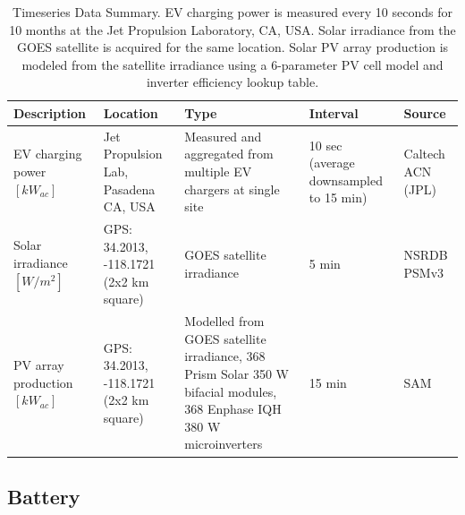 \documentclass[journal,article,submit,pdftex,moreauthors]{Definitions/mdpi}
\begin{document}
\begin{table}[!h]
  \centering
  \caption{Timeseries Data Summary. EV charging power is measured every 10 seconds for 10 months at the Jet Propulsion Laboratory, CA, USA. Solar irradiance from the GOES satellite is acquired for the same location. Solar PV array production is modeled from the satellite irradiance using a 6-parameter PV cell model and inverter efficiency lookup table.\label{tab:loadsectors}}
  \label{tab:data-summary}
  \begin{tabularx}{\linewidth}{XXXXX}
    \toprule
    Description                     & Location                                & Type                                                                                                             & Interval                               & Source            \\
    \midrule
    EV charging power $[kW_{ac}]$    & Jet Propulsion Lab, Pasadena CA, USA    & Measured and aggregated from multiple  EV chargers at single site                                                & 10 sec (average downsampled to 15 min) & Caltech ACN (JPL) \cite{Lee2021}  \\
    Solar irradiance $[W/m^2]$       & GPS: 34.2013, -118.1721 (2x2 km square) & GOES satellite irradiance                                                                                        & 5 min                                  & NSRDB PSMv3 \cite{Sengupta2018}       \\
    PV array production $[kW_{ac}]$ & GPS: 34.2013, -118.1721 (2x2 km square) & Modelled from GOES satellite irradiance, 368 Prism Solar 350 W bifacial modules, 368 Enphase IQH 380 W microinverters & 15 min                                 & SAM \cite{NREL2022} \\

    \bottomrule
  \end{tabularx}
\end{table}

\subsection{Battery}\label{battery}%
\end{document}

